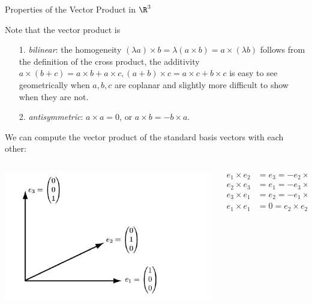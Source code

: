 \documentclass[smaller,hyperref={CJKbookmarks=true}]{beamer}
\begin{document}
\begin{frame}[t,shrink]{Properties of the Vector Product in $\R^3$}
\begin{spacing}{1}
Note that the vector product is
\begin{itemize}
  \item[1.] \emph{bilinear}: the homogeneity $(\lambda a)\times b=\lambda(a\times b)=a\times(\lambda b)$ follows from the definition of the cross product, the additivity $a\times(b+c)=a\times b+a\times c,(a+b)\times c=a\times c+b\times c$ is easy to see geometrically when $a, b, c$ are coplanar and slightly more dif{}ficult
      to show when they are not.
  \item[2.] \emph{antisymmetric}: $a\times a=0$, or $a\times b=-b\times a$.
\end{itemize}
We can compute the vector product of the standard basis vectors with
each other:\\[5pt]
\begin{columns}[c,totalwidth=0.9\textwidth]
\begin{column}{0.4\textwidth}
\includegraphics[width=\columnwidth]{84.jpg}
\end{column}
\begin{column}{0.5\textwidth}
\begin{align}\label{1.7.3}
  e_1\times e_2 &=e_3=-e_2\times e_1\nonumber \\
  e_2\times e_3 &=e_1=-e_3\times e_2\nonumber \\
  e_3\times e_1 &=e_2=-e_1\times e_3\nonumber \\
  e_1\times e_1 &=0=e_2\times e_2=e_3\times e_3
\end{align}
\end{column}
\end{columns}
\end{spacing}
\end{frame}
\end{document}
